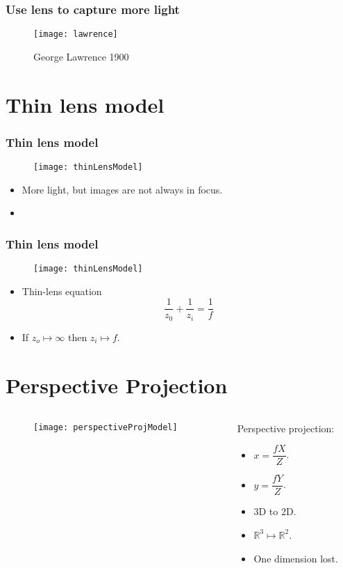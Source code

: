 \begin{frame}
\frametitle{Use lens to capture more light}
\begin{figure}[!h]
\centering
\texttt{[image: lawrence]}
\caption{George Lawrence 1900}
\end{figure}
\end{frame}

\section{Thin lens model}

\begin{frame}
\frametitle{Thin lens model}
\begin{figure}[!h]
\centering
\texttt{[image: thinLensModel]}
\end{figure}
\begin{itemize}
\item More light, but images are not always in focus.
\item 
\end{itemize}
\end{frame}

\begin{frame}
\frametitle{Thin lens model}
\begin{figure}[!h]
\centering
\texttt{[image: thinLensModel]}
\end{figure}
\begin{itemize}
\item Thin-lens equation
\[
\dfrac{1}{z_0} + \dfrac{1}{z_{i}} = \dfrac{1}{f}
\]
\item If $z_o \mapsto \infty$ then $z_i \mapsto f$.
\end{itemize}
\end{frame}

\section{Perspective Projection}

\begin{frame}
\begin{columns}
\begin{column}{.6\textwidth}
\begin{figure}[!h]
\centering
\texttt{[image: perspectiveProjModel]}
\end{figure}
\end{column}
\begin{column}{.5\textwidth}
Perspective projection:
\begin{itemize}
\item $x = \dfrac{fX}{Z}$.
\item $y = \dfrac{fY}{Z}$.
\item 3D to 2D.
\item $\mathbb{R}^{3} \mapsto \mathbb{R}^{2}$.
\item One dimension lost.
\end{itemize}
\end{column}
\end{columns}
\end{frame}

